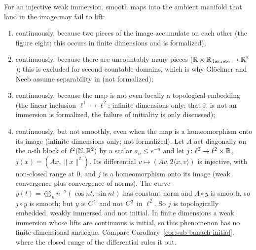 \begin{remark}
  \label{rem:sub-mechanisms}
  For an injective weak immersion, smooth maps into the ambient manifold that land in the image
  may fail to lift:
  \begin{enumerate}
    \item continuously, because two pieces of the image accumulate on each other (the figure
      eight; this occurs in finite dimensions and is formalized);
    \item continuously, because there are uncountably many pieces ($\mathbb{R} \times \mathbb{R}_{\mathrm{discrete}}
      \to \mathbb{R}^2$); this is excluded for second countable domains, which is why Glöckner and Neeb
      assume separability in \cite[Thm.~9.2.15]{GN26} (not formalized);
    \item continuously, because the map is not even locally a topological embedding (the linear
      inclusion $\ell^1 \to \ell^2$; infinite dimensions only; that it is not an immersion is
      formalized, the failure of initiality is only discussed);
    \item continuously, but not smoothly, even when the map is a homeomorphism onto its image
      (infinite dimensions only; not formalized). Let $A$ act diagonally on the $n$-th block of
      $\ell^2(\mathbb{N}, \mathbb{R}^2)$ by a scalar $a_n \le e^{-n}$ and let
      $j \colon \ell^2 \to \ell^2 \times \mathbb{R}$, $j(x) = (Ax, \|x\|^2)$. Its differential
      $v \mapsto (Av, 2\langle x, v\rangle)$ is injective, with non-closed range at $0$, and $j$
      is a homeomorphism onto its image (weak convergence plus convergence of norms). The curve
      $y(t) = \bigoplus_n n^{-2}(\cos nt, \sin nt)$ has constant norm and $A \circ y$ is smooth,
      so $j \circ y$ is smooth; but $y$ is $C^{1}$ and not $C^{2}$ in $\ell^2$. So $j$ is
      topologically embedded, weakly immersed and not initial. In finite dimensions a weak
      immersion whose lifts are continuous is initial, so this phenomenon has no
      finite-dimensional analogue. Compare Corollary~\ref{cor:sub-banach-initial}, where the
      closed range of the differential rules it out.
  \end{enumerate}
\end{remark}

